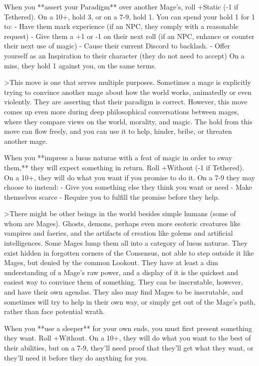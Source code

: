 \documentclass[
  oneside,
  statementpaper,
  9pt]{memoir}
\begin{document}
\begin{Player}

When you **assert your Paradigm** over another Mage’s, roll +Static (-1 if Tethered). On a 10+, hold 3, or on a 7-9, hold 1. You can spend your hold 1 for 1 to:
- Have them mark experience (if an NPC, they comply with a reasonable request)
- Give them a +1 or -1 on their next roll (if an NPC, enhance or counter their next use of magic)
- Cause their current Discord to backlash. 
- Offer yourself as an Inspiration to their character (they do not need to accept)
On a miss, they hold 1 against you, on the same terms.

>This move is one that serves multiple purposes. Sometimes a mage is explicitly trying to convince another mage about how the world works, animatedly or even violently. They are asserting that their paradigm is correct. However, this move comes up even more during deep philosophical conversations between mages, where they compare views on the world, morality, and magic. The hold from this move can flow freely, and you can use it to help, hinder, bribe, or threaten another mage.

When you **impress a lusus naturae with a feat of magic in order to sway them,** they will expect something in return. Roll +Without (-1 if Tethered). On a 10+, they will do what you want if you promise to do it. On a 7-9 they may choose to instead:
- Give you something else they think you want or need
- Make themselves scarce
- Require you to fulfill the promise before they help.

>There might be other beings in the world besides simple humans (some of whom are Mages). Ghosts, demons, perhaps even more esoteric creatures like vampires and faeries, and the artifacts of creation like golems and artificial intelligences. Some Mages lump them all into a category of lusus naturae. They exist hidden in forgotten corners of the Consensus, not able to step outside it like Mages, but denied by the common Lookout. They have at least a dim understanding of a Mage’s raw power, and a display of it is the quickest and easiest way to convince them of something. They can be inscrutable, however, and have their own agendas. They also may find Mages to be inscrutable, and sometimes will try to help in their own way, or simply get out of the Mage’s path, rather than face potential wrath.

When you **use a sleeper** for your own ends, you must first present something they want. Roll +Without. On a 10+, they will do what you want to the best of their abilities, but on a 7-9, they’ll need proof that they’ll get what they want, or they’ll need it before they do anything for you.


\end{Player}
\end{document}
